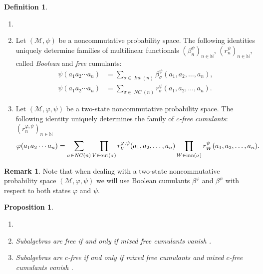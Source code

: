 \documentclass[12pt]{amsart}
\DeclareMathOperator{\IntPart}{\mathit{Int}}
\newcommand\IN{{\mathbb N}}
\DeclareMathOperator{\NC}{\mathit{NC}} %
\DeclareMathOperator{\IB}{\mathrm{inn}} %
\DeclareMathOperator{\OB}{\mathrm{out}} %
\newtheorem{proposition}[theorem]{Proposition}
\theoremstyle{definition}
\newtheorem{definition}[theorem]{Definition}
\newtheorem{remark}[theorem]{Remark}
\numberwithin{equation}{section}
\begin{document}
\begin{definition}%
  \begin{enumerate}[label=(\roman*)]
   \item []
   \item 
  Let $(\mathcal{M},\psi)$ be a noncommutative probability space. The following identities uniquely determine families of multilinear
  functionals $(\beta^\psi_n)_{n\in\IN}$,
  $(r^\psi_n)_{n\in\IN}$,
  called \emph{Boolean} and \emph{free} cumulants:
  \begin{align}
  \psi(a_1a_2\dotsm a_n)
  &=\sum_{\sigma \in \IntPart(n)}\beta^\psi_{\sigma}(a_1,a_2,\ldots,a_n),
    \nonumber
  \\
  \psi(a_1a_2\dotsm a_n)
  &=\sum_{\sigma \in \NC(n)}r^\psi_{\sigma}(a_1,a_2,\ldots,a_n).
    \nonumber
\end{align}
\item 
	Let $(\mathcal{M},\varphi,\psi)$ be a two-state noncommutative probability space. The following identity uniquely determines the family of \emph{$c$-free cumulants}: $(r_{n}^{\varphi,\psi})_{n\in\mathbb{N}}$
\begin{align}
  \varphi(a_1a_2\cdots a_n)
  &=\sum_{\sigma\in \NC(n)}
    \prod_{
  V\in\OB(\sigma)              
  }
  r_{V}^{\varphi,\psi}(a_1,a_2,\ldots,a_n)
  \prod_{
  W\in\IB(\sigma)  
  }
  r_{W}^{\psi}(a_1,a_2,\ldots,a_n)
  .\label{eq:mccfree}
	\end{align}

  \end{enumerate}
\end{definition}
\begin{remark}
	Note that when dealing with a two-state noncommutative probability space $(\mathcal{M},\varphi,\psi)$ we will use Boolean cumulants $\beta^{\varphi}$ and $\beta^\psi$ with respect to both states $\varphi$ and $\psi$.
\end{remark}

\begin{proposition}
  \label{prop:vanishingmixedcumulants}
  \begin{enumerate}[label=(\roman*)]
   \item []
   \item Subalgebras are free if and only if mixed free cumulants vanish \cite{SpeicherNC}.
   \item Subalgebras are $c$-free if and only if mixed free cumulants and mixed
    $c$-free cumulants vanish \cite{BozejkoLeinertSpeicher:1996:convolution}.

  \end{enumerate}
\end{proposition}
\end{document}
